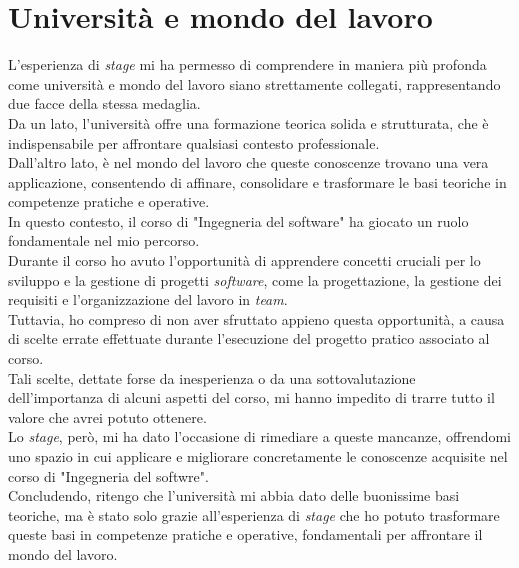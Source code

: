 \pagebreak
\section{Università e mondo del lavoro}
\label{sez:universita-mondo-lavoro}

L’esperienza di \textit{stage} mi ha permesso di comprendere in maniera più profonda come università e mondo del lavoro siano strettamente collegati, rappresentando due facce della stessa medaglia.\\
Da un lato, l’università offre una formazione teorica solida e strutturata, che è indispensabile per affrontare qualsiasi contesto professionale. \\
Dall’altro lato, è nel mondo del lavoro che queste conoscenze trovano una vera applicazione, consentendo di affinare, consolidare e trasformare le basi teoriche in competenze pratiche e operative.  \\

\noindent In questo contesto, il corso di "Ingegneria del software" ha giocato un ruolo fondamentale nel mio percorso.\\
Durante il corso ho avuto l’opportunità di apprendere concetti cruciali per lo sviluppo e la gestione di progetti \textit{software}, come la progettazione, la gestione dei requisiti e l’organizzazione del lavoro in \textit{team}. \\
Tuttavia, ho compreso di non aver sfruttato appieno questa opportunità, a causa di scelte errate effettuate durante l’esecuzione del progetto pratico associato al corso.\\
Tali scelte, dettate forse da inesperienza o da una sottovalutazione dell’importanza di alcuni aspetti del corso, mi hanno impedito di trarre tutto il valore che avrei potuto ottenere. \\ 

\noindent Lo \textit{stage}, però, mi ha dato l’occasione di rimediare a queste mancanze, offrendomi uno spazio in cui applicare e migliorare concretamente le conoscenze acquisite nel corso di "Ingegneria del softwre".\\

\noindent Concludendo, ritengo che l'università mi abbia dato delle buonissime basi teoriche, ma è stato solo grazie all'esperienza di \textit{stage} che ho potuto trasformare queste basi in competenze pratiche e operative, fondamentali per affrontare il mondo del lavoro.\\